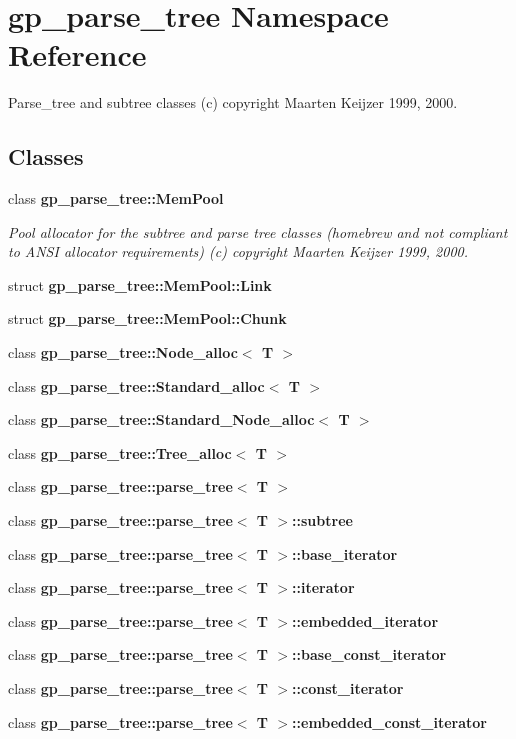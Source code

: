 \section{gp\_\-parse\_\-tree Namespace Reference}
\label{namespacegp__parse__tree}
Parse\_\-tree and subtree classes (c) copyright Maarten Keijzer 1999, 2000.  


\subsection*{Classes}
\begin{CompactItemize}
\item 
class {\bf gp\_\-parse\_\-tree::Mem\-Pool}
\begin{CompactList}\small\item\em Pool allocator for the subtree and parse tree classes (homebrew and not compliant to ANSI allocator requirements) (c) copyright Maarten Keijzer 1999, 2000. \item\end{CompactList}\item 
struct {\bf gp\_\-parse\_\-tree::Mem\-Pool::Link}
\item 
struct {\bf gp\_\-parse\_\-tree::Mem\-Pool::Chunk}
\item 
class {\bf gp\_\-parse\_\-tree::Node\_\-alloc$<$ T $>$}
\item 
class {\bf gp\_\-parse\_\-tree::Standard\_\-alloc$<$ T $>$}
\item 
class {\bf gp\_\-parse\_\-tree::Standard\_\-Node\_\-alloc$<$ T $>$}
\item 
class {\bf gp\_\-parse\_\-tree::Tree\_\-alloc$<$ T $>$}
\item 
class {\bf gp\_\-parse\_\-tree::parse\_\-tree$<$ T $>$}
\item 
class {\bf gp\_\-parse\_\-tree::parse\_\-tree$<$ T $>$::subtree}
\item 
class {\bf gp\_\-parse\_\-tree::parse\_\-tree$<$ T $>$::base\_\-iterator}
\item 
class {\bf gp\_\-parse\_\-tree::parse\_\-tree$<$ T $>$::iterator}
\item 
class {\bf gp\_\-parse\_\-tree::parse\_\-tree$<$ T $>$::embedded\_\-iterator}
\item 
class {\bf gp\_\-parse\_\-tree::parse\_\-tree$<$ T $>$::base\_\-const\_\-iterator}
\item 
class {\bf gp\_\-parse\_\-tree::parse\_\-tree$<$ T $>$::const\_\-iterator}
\item 
class {\bf gp\_\-parse\_\-tree::parse\_\-tree$<$ T $>$::embedded\_\-const\_\-iterator}
\end{CompactItemize}
